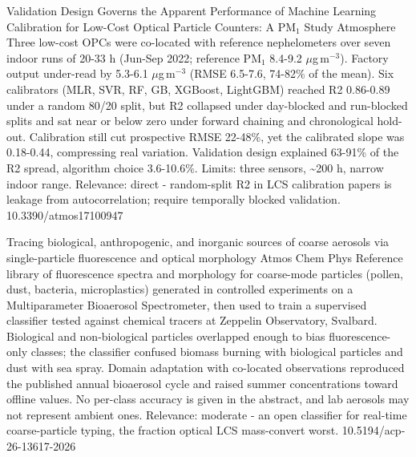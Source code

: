 \documentclass[10pt]{article}
\begin{document}
\par{}\baselineskip{}\baselineskip
{}

{Validation Design Governs the Apparent Performance of Machine Learning Calibration for Low-Cost Optical Particle Counters: A PM$_{1}$ Study}
{Atmosphere}
{Three low-cost OPCs were co-located with reference nephelometers over seven indoor runs of 20-33 h (Jun-Sep 2022; reference PM$_{1}$ 8.4-9.2 $\mu$g\,m$^{-3}$). Factory output under-read by 5.3-6.1 $\mu$g\,m$^{-3}$ (RMSE 6.5-7.6, 74-82\% of the mean). Six calibrators (MLR, SVR, RF, GB, XGBoost, LightGBM) reached R2 0.86-0.89 under a random 80/20 split, but R2 collapsed under day-blocked and run-blocked splits and sat near or below zero under forward chaining and chronological hold-out. Calibration still cut prospective RMSE 22-48\%, yet the calibrated slope was 0.18-0.44, compressing real variation. Validation design explained 63-91\% of the R2 spread, algorithm choice 3.6-10.6\%. Limits: three sensors, \textasciitilde{}200 h, narrow indoor range. Relevance: direct - random-split R2 in LCS calibration papers is leakage from autocorrelation; require temporally blocked validation.}
{10.3390/atmos17100947}

{Tracing biological, anthropogenic, and inorganic sources of coarse aerosols via single-particle fluorescence and optical morphology}
{Atmos Chem Phys}
{Reference library of fluorescence spectra and morphology for coarse-mode particles (pollen, dust, bacteria, microplastics) generated in controlled experiments on a Multiparameter Bioaerosol Spectrometer, then used to train a supervised classifier tested against chemical tracers at Zeppelin Observatory, Svalbard. Biological and non-biological particles overlapped enough to bias fluorescence-only classes; the classifier confused biomass burning with biological particles and dust with sea spray. Domain adaptation with co-located observations reproduced the published annual bioaerosol cycle and raised summer concentrations toward offline values. No per-class accuracy is given in the abstract, and lab aerosols may not represent ambient ones. Relevance: moderate - an open classifier for real-time coarse-particle typing, the fraction optical LCS mass-convert worst.}
{10.5194/acp-26-13617-2026}
\end{document}

